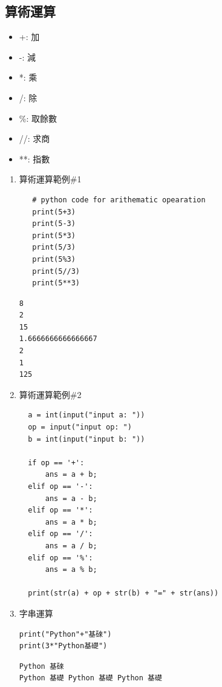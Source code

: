 \documentclass[a4paper,12pt]{article}
\begin{document}
\subsection{算術運算}
\label{sec:orgb908a98}
\begin{itemize}
\item +: 加\\
\item -: 減\\
\item *: 乘\\
\item /: 除\\
\item \%: 取餘數\\
\item //: 求商\\
\item **: 指數\\
\end{itemize}
\begin{enumerate}
\item 算術運算範例\#1
\label{sec:org29d6c6e}
\lstset{breaklines=true,language=Python,label= ,caption= ,captionpos=b,firstnumber=1,numbers=left}
\begin{lstlisting}
   # python code for arithematic opearation
   print(5+3)
   print(5-3)
   print(5*3)
   print(5/3)
   print(5%3)
   print(5//3)
   print(5**3)
\end{lstlisting}

\begin{verbatim}
8
2
15
1.6666666666666667
2
1
125
\end{verbatim}

\item 算術運算範例\#2
\label{sec:org9be5655}
\lstset{breaklines=true,language=Python,label=計算機,caption= ,captionpos=b,firstnumber=1,numbers=left}
\begin{lstlisting}
  a = int(input("input a: "))
  op = input("input op: ")
  b = int(input("input b: "))

  if op == '+':
      ans = a + b;
  elif op == '-':
      ans = a - b;
  elif op == '*':
      ans = a * b;
  elif op == '/':
      ans = a / b;
  elif op == '%':
      ans = a % b;

  print(str(a) + op + str(b) + "=" + str(ans))
\end{lstlisting}

\item 字串運算
\label{sec:org72137d6}
\lstset{breaklines=true,language=Python,label= ,caption= ,captionpos=b,firstnumber=1,numbers=left}
\begin{lstlisting}
print("Python"+"基䂾")
print(3*"Python基礎")
\end{lstlisting}

\begin{verbatim}
Python 基䂾
Python 基礎 Python 基礎 Python 基礎
\end{verbatim}
\end{enumerate}
\end{document}
